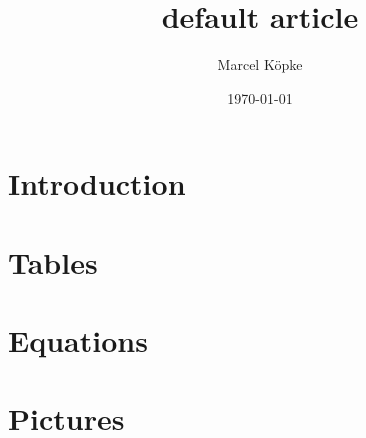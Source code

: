 \documentclass[a4paper, 12pt]{article}
\title{default article}
\author{Marcel Köpke}
\date{\today}
\begin{document}
\maketitle

\tableofcontents


\section{Introduction}
\label{sec:introduction}


\clearpage
\section{Tables}
\label{sec:tables}


\clearpage
\section{Equations}
\label{sec:equations}


\clearpage
\section{Pictures}
\label{sec:pictures}



\clearpage
\printbibliography
\end{document}
